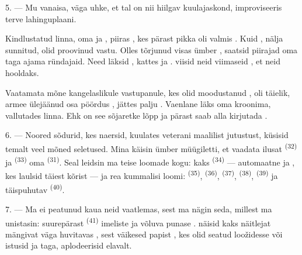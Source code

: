 5. --- Mu vanaisa, väga uhke, et tal on nii hiilgav kuulajaskond, improviseeris terve
lahinguplaani.

Kindlustatud linna, oma  ja , piiras
, kes pärast pikka  oli valmis
. Kuid , nälja sunnitud, olid proovinud
   vastu. Olles tõrjunud
 visas  ümber , saatsid
 piirajad oma  taga ajama 
ründajaid. Need läksid , kattes 
 ja .  viisid neid viimaseid
, et  neid hooldaks.

Vaatamata mõne  kangelaslikule vastupanule, kes olid moodustanud
, oli  täielik, armee ülejäänud osa pöördus
, jättes palju . Vaenlane läks oma 
kroonima, vallutades linna. Ehk on see sõjaretke lõpp ja pärast  saab
alla kirjutada .

\VUsaut{4.4mm}
\VUsaut{2.8mm}

6. --- Noored sõdurid, kes naersid, kuulates veterani maalilist jutustust, küsisid
temalt veel mõned seletused. Mina käisin ümber müügiletti, et vaadata ilusat 
\textsuperscript{(32)} ja  \textsuperscript{(33)} oma 
\textsuperscript{(31)}. Seal leidsin ma teise loomade kogu: kaks 
\textsuperscript{(34)} --- automaatne  ja , kes laulsid
täiest kõrist --- ja rea kummalisi loomi:  \textsuperscript{(35)},
 \textsuperscript{(36)},  \textsuperscript{(37)},
 \textsuperscript{(38)},  \textsuperscript{(39)} ja
täispuhutav  \textsuperscript{(40)}.

7. --- Ma ei peatunud kaua neid vaatlemas, sest ma nägin seda, millest ma unistasin:
suurepärast  \textsuperscript{(41)} imeliste
 ja võluva punase .  näisid
kaks näitlejat mängivat  väga huvitavas , sest väikesed
papist , kes olid seatud loožidesse või istusid
 ja   taga, aplodeerisid
elavalt.

